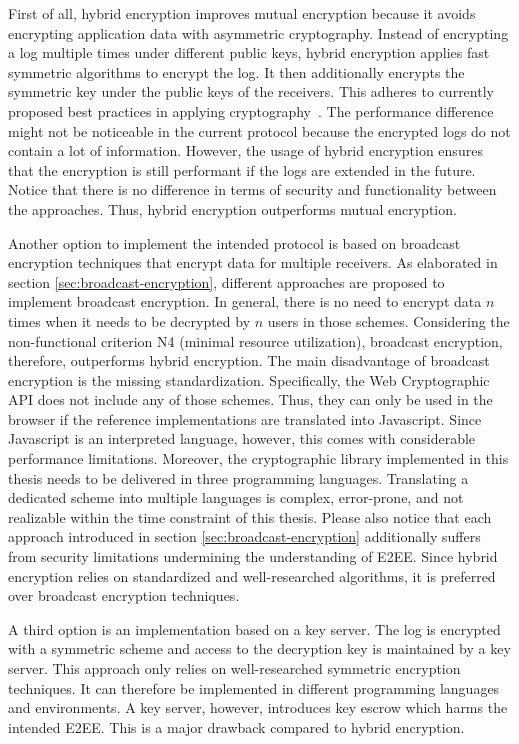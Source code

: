 \documentclass[../main.tex]{subfiles}
\begin{document}
First of all, hybrid encryption improves mutual encryption because it avoids encrypting application data with asymmetric cryptography.
Instead of encrypting a log multiple times under different public keys, hybrid encryption applies fast symmetric algorithms to encrypt the log.
It then additionally encrypts the symmetric key under the public keys of the receivers.
This adheres to currently proposed best practices in applying cryptography~\cite[340]{Eckert2018}.
The performance difference might not be noticeable in the current protocol because the encrypted logs do not contain a lot of information.
However, the usage of hybrid encryption ensures that the encryption is still performant if the logs are extended in the future.
Notice that there is no difference in terms of security and functionality between the approaches.
Thus, hybrid encryption outperforms mutual encryption.

Another option to implement the intended protocol is based on broadcast encryption techniques that encrypt data for multiple receivers.
As elaborated in section \ref{sec:broadcast-encryption}, different approaches are proposed to implement broadcast encryption.
In general, there is no need to encrypt data $n$ times when it needs to be decrypted by $n$ users in those schemes.
Considering the non-functional criterion N4 (minimal resource utilization), broadcast encryption, therefore, outperforms hybrid encryption.
The main disadvantage of broadcast encryption is the missing standardization.
Specifically, the Web Cryptographic API does not include any of those schemes.
Thus, they can only be used in the browser if the reference implementations are translated into Javascript.
Since Javascript is an interpreted language, however, this comes with considerable performance limitations.
Moreover, the cryptographic library implemented in this thesis needs to be delivered in three programming languages.
Translating a dedicated scheme into multiple languages is complex, error-prone, and not realizable within the time constraint of this thesis.
Please also notice that each approach introduced in section \ref{sec:broadcast-encryption} additionally suffers from security limitations undermining the understanding of E2EE.
Since hybrid encryption relies on standardized and well-researched algorithms, it is preferred over broadcast encryption techniques.

A third option is an implementation based on a key server.
The log is encrypted with a symmetric scheme and access to the decryption key is maintained by a key server.
This approach only relies on well-researched symmetric encryption techniques.
It can therefore be implemented in different programming languages and environments.
A key server, however, introduces key escrow which harms the intended E2EE.
This is a major drawback compared to hybrid encryption.
\end{document}
